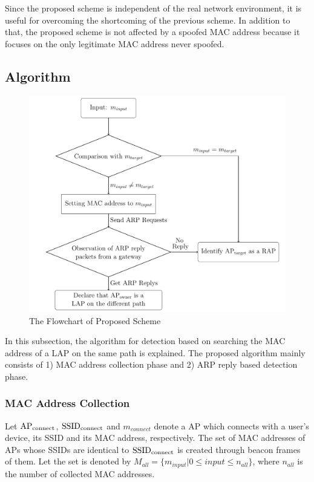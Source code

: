 \documentclass[conference]{IEEEtran}
\newcommand{\SSID}{\rm SSID_{connect}}
\newcommand{\tarAP}{\rm AP_{connect}}
\newcommand{\tarMAC}{m_{connect}}
\begin{document}
Since the proposed scheme is independent of the real network environment, it is useful for overcoming the shortcoming of the previous scheme.
In addition to that, the proposed scheme is not affected by a spoofed MAC address because it focuses on the only legitimate MAC address never spoofed.

\subsection{Algorithm}
\begin{figure}[t]
    \begin{center}
        \includegraphics[scale=0.45]{flowchart/flowchart.pdf}
        \caption{The Flowchart of Proposed Scheme}
        \label{fig:flowchart}
    \end{center}
\end{figure}
In this subsection, the algorithm for detection based on searching the MAC address of a LAP on the same path is explained.
The proposed algorithm mainly consists of 1) MAC address collection phase and 2) ARP reply based detection phase. 

\subsubsection{MAC Address Collection}
Let $\tarAP$, $\SSID$ and $\tarMAC$ denote a AP which connects with a user's device, its SSID and its MAC address, respectively.
The set of MAC addresses of APs whose SSIDs are identical to $\SSID$  is created through beacon frames of them. 
Let the set is denoted by $M_{all}=\{m_{input}|0\le input \le n_{all}  \}$, where $n_{all}$ is the number of collected MAC addresses.
\end{document}
